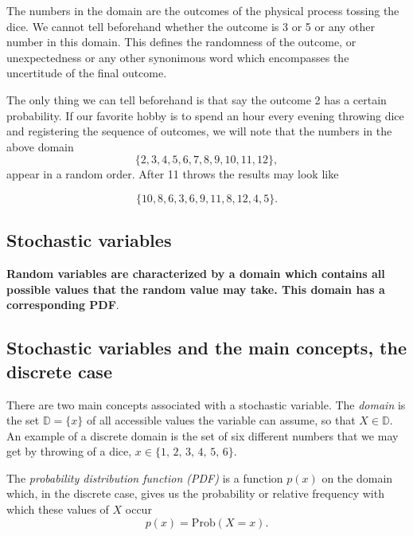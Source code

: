 \documentclass[%
oneside,                 %
final,                   %
10pt]{article}
\newenvironment{block_mdfboxadmon}[1][]{
\begin{block_mdfboxmdframed}[frametitle=#1]
}
{
\end{block_mdfboxmdframed}
}
\begin{document}
\begin{block_mdfboxadmon}[]
The numbers in the domain are the outcomes of the physical process tossing the dice.
We cannot tell beforehand whether the outcome is 3 or 5 or any other number in this domain.
This defines the randomness of the outcome, or unexpectedness or any other synonimous word which
encompasses the uncertitude of the final outcome. 

The only thing we can tell beforehand
is that say the outcome 2 has a certain probability.  
If our favorite hobby is to  spend an hour every evening throwing dice and 
registering the sequence of outcomes, we will note that the numbers in the above domain
\begin{equation*}
\{2,3,4,5,6,7,8,9,10,11,12\},
\end{equation*}
appear in a random order. After 11 throws the results may look like

\begin{equation*}
\{10,8,6,3,6,9,11,8,12,4,5\}. 
\end{equation*}
\end{block_mdfboxadmon} %



\subsection{Stochastic variables}

\begin{block_mdfboxadmon}[]

\textbf{Random variables are characterized by a domain which contains all possible values that the random value may take. This domain has a corresponding PDF}.
\end{block_mdfboxadmon} %



\subsection{Stochastic variables and the main concepts, the discrete case}

\begin{block_mdfboxadmon}[]
There are two main concepts associated with a stochastic variable. The
\emph{domain} is the set $\mathbb D = \{x\}$ of all accessible values
the variable can assume, so that $X \in \mathbb D$. An example of a
discrete domain is the set of six different numbers that we may get by
throwing of a dice, $x\in\{1,\,2,\,3,\,4,\,5,\,6\}$.

The \emph{probability distribution function (PDF)} is a function
$p(x)$ on the domain which, in the discrete case, gives us the
probability or relative frequency with which these values of $X$
occur
\begin{equation*}
p(x) = \mathrm{Prob}(X=x).
\end{equation*}
\end{block_mdfboxadmon} %
\end{document}
